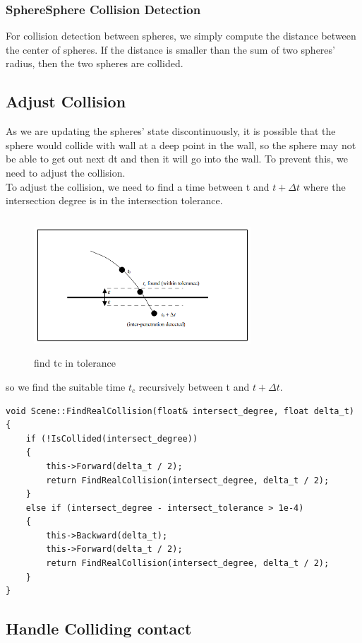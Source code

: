 \documentclass[acmtog]{acmart}
\begin{document}
\subsubsection{SphereSphere Collision Detection}
\quad For collision detection between spheres, we simply compute the distance between the center of spheres. If the distance is smaller than the sum of two spheres' radius, then
the two spheres are collided.
\subsection{Adjust Collision}
As we are updating the spheres' state discontinuously, it is possible that the sphere would collide with wall at a deep point in the wall, so the sphere may not be able to get out
next dt and then it will go into the wall. To prevent this, we need to adjust the collision.\\
To adjust the collision, we need to find a time between t and $t + \Delta t$ where the intersection degree is in the intersection tolerance.
\begin{figure}[H]
	\centering
	\includegraphics[width=3.2in, height = 2in]{images/interpenetration.png}
	\caption{find tc in tolerance}
\end{figure}
so we find the suitable time $t_c$ recursively between t and $t + \Delta t$.
\begin{lstlisting}
void Scene::FindRealCollision(float& intersect_degree, float delta_t)
{
    if (!IsCollided(intersect_degree))
    {
        this->Forward(delta_t / 2);
        return FindRealCollision(intersect_degree, delta_t / 2);
    }
    else if (intersect_degree - intersect_tolerance > 1e-4)
    {
        this->Backward(delta_t);
        this->Forward(delta_t / 2);
        return FindRealCollision(intersect_degree, delta_t / 2);
    }
}
\end{lstlisting}
\subsection{Handle Colliding contact}
\end{document}
